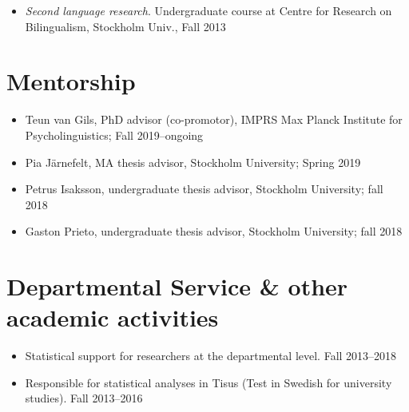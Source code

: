\documentclass[margin, 11pt]{res} %
\begin{document}
\begin{resume}
\begin{itemize}
\item \textit{Second language research}. Undergraduate course at Centre for Research on Bilingualism, Stockholm Univ., Fall 2013 

\end{itemize}


\section{\sc Mentorship}

\begin{itemize}

\item Teun van Gils, PhD advisor (co-promotor), IMPRS Max Planck Institute for Psycholinguistics; Fall 2019--ongoing

\item Pia Järnefelt, MA thesis advisor, Stockholm University; Spring 2019

\item Petrus Isaksson, undergraduate thesis advisor, Stockholm University; fall 2018

\item Gaston Prieto, undergraduate thesis advisor, Stockholm University; fall 2018

\end{itemize}



\section{\sc Departmental Service \& other academic activities}

\begin{itemize}

\item Statistical support for researchers at the departmental level. 
Fall 2013--2018

\item Responsible for statistical analyses in Tisus (Test in Swedish for university studies). 
Fall 2013--2016



\end{itemize}
\end{resume}
\end{document}
